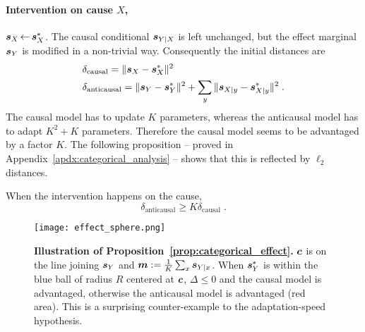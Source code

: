 \paragraph{Intervention on cause $X$, } ${\bm{s}}_X \operatorname{\leftarrow} {\bm{s}}^*_X$.
The causal  conditional ${\bm{s}}_{Y|X}$ is left unchanged,
but the effect marginal ${\bm{s}}_Y$ is modified in a non-trivial way. 
Consequently the initial distances are 
\begin{align}
    &\delta_\text{causal} 
    = \|{\bm{s}}_X - {\bm{s}}^*_X\|^2 
    \\
    &\delta_\text{anticausal} 
    = \|{\bm{s}}_Y - {\bm{s}}^*_Y\|^2 
    + \sum_y \|{\bm{s}}_{X|y} - {\bm{s}}^*_{X|y}\|^2 \; .
\end{align}
The causal model has to update $K$ parameters, whereas the anticausal model has to adapt $K^2 + K$ parameters. Therefore the causal model seems to be advantaged by a factor $K$. The following proposition -- proved in  Appendix~\ref{apdx:categorical_analysis} -- shows that this is reflected by $\ell_2$ distances.
\begin{proposition}
\label{prop:categorical_cause}
When the intervention happens on the cause,
\begin{equation}
    \delta_\text{anticausal} \geq K \delta_\text{causal} \; .
\end{equation}
\end{proposition}

\begin{figure}
    \centering
    \texttt{[image: effect\_sphere.png]}
    \caption[Illustration of Proposition~\ref{prop:categorical_effect}]{
    \textbf{Illustration of Proposition~\ref{prop:categorical_effect}.}
    ${\bm{c}}$ is on the line joining ${\bm{s}}_Y$ and ${\bm{m}} := \frac{1}{K} \sum_x {\bm{s}}_{Y|x}$. 
    When ${\bm{s}}^*_Y$ is within the blue ball of radius $R$ centered at ${\bm{c}}$, $\Delta \leq 0$ and the causal model is advantaged, otherwise the anticausal model is advantaged (red area). 
    This is a surprising counter-example to the adaptation-speed hypothesis.}
    \label{fig:effect_sphere}
\end{figure}

